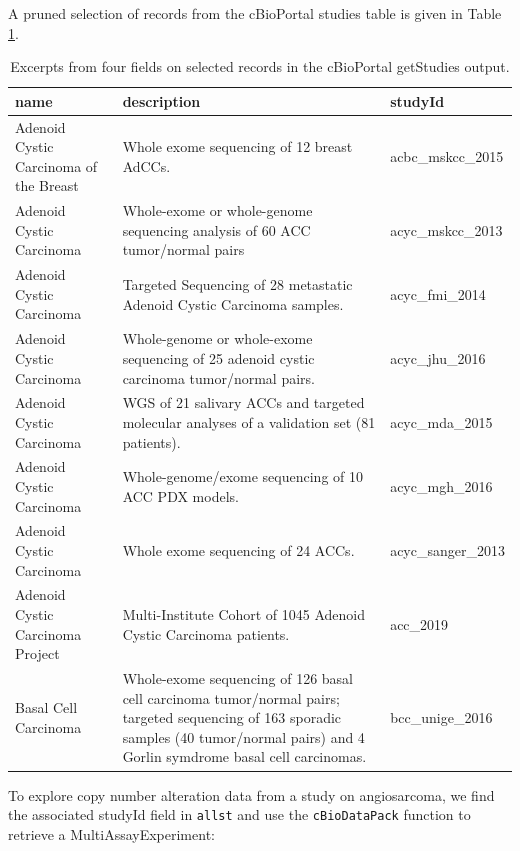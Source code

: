 \documentclass[]{article}
\begin{document}
A pruned selection of records from the cBioPortal
studies table is given in Table \ref{tab:tab-cball}.

\begin{longtable}[t]{>{\raggedright\arraybackslash}p{12em}>{\raggedright\arraybackslash}p{15em}l}
\caption{\label{tab:tab-cball}Excerpts from four fields on selected records in the cBioPortal getStudies output.}\\
\toprule
name & description & studyId\\
\midrule
Adenoid Cystic Carcinoma of the Breast & Whole exome sequencing of 12 breast AdCCs. & acbc\_mskcc\_2015\\
Adenoid Cystic Carcinoma & Whole-exome or whole-genome sequencing analysis of 60 ACC tumor/normal pairs & acyc\_mskcc\_2013\\
Adenoid Cystic Carcinoma & Targeted Sequencing of 28 metastatic Adenoid Cystic Carcinoma samples. & acyc\_fmi\_2014\\
Adenoid Cystic Carcinoma & Whole-genome or whole-exome sequencing of 25 adenoid cystic carcinoma tumor/normal pairs. & acyc\_jhu\_2016\\
Adenoid Cystic Carcinoma & WGS of 21 salivary ACCs and targeted molecular analyses of a validation set (81 patients). & acyc\_mda\_2015\\
\addlinespace
Adenoid Cystic Carcinoma & Whole-genome/exome sequencing of 10 ACC PDX models. & acyc\_mgh\_2016\\
Adenoid Cystic Carcinoma & Whole exome sequencing of 24 ACCs. & acyc\_sanger\_2013\\
Adenoid Cystic Carcinoma Project & Multi-Institute Cohort of 1045 Adenoid Cystic Carcinoma patients. & acc\_2019\\
Basal Cell Carcinoma & Whole-exome sequencing of 126 basal cell carcinoma tumor/normal pairs; targeted sequencing of 163 sporadic samples (40 tumor/normal pairs) and 4 Gorlin symdrome basal cell carcinomas. & bcc\_unige\_2016\\
\bottomrule
\end{longtable}

To explore copy number alteration data from a study on angiosarcoma,
we find the associated studyId field in \texttt{allst} and use the \texttt{cBioDataPack} function
to retrieve a MultiAssayExperiment:
\end{document}
